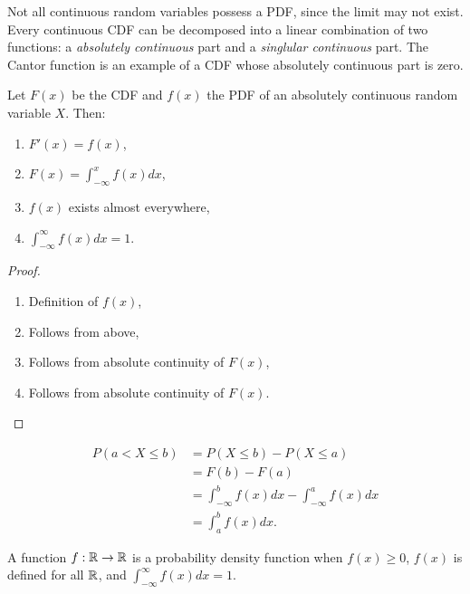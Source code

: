 \begin{rmk}
    Not all continuous random variables possess a PDF, since the limit may not exist. Every continuous CDF can be decomposed into a linear combination of two functions: a \emph{absolutely continuous} part and a \emph{singlular continuous} part. The Cantor function is an example of a CDF whose absolutely continuous part is zero.
\end{rmk}

\begin{thm}
    Let $F(x)$ be the CDF and $f(x)$ the PDF of an absolutely continuous random variable $X$. Then:
    \begin{enumerate}
        \item $F'(x) = f(x)$,
        \item $F(x) = \int_{-\infty}^{x}f(x)dx$,
        \item $f(x)$ exists almost everywhere,
        \item $\int_{-\infty}^{\infty}f(x)dx = 1$.
    \end{enumerate}
\end{thm}

\begin{proof}\proofbreak
    \begin{enumerate}
        \item Definition of $f(x)$,
        \item Follows from above,
        \item Follows from absolute continuity of $F(x)$,
        \item Follows from absolute continuity of $F(x)$.
    \end{enumerate}
\end{proof}

\begin{cor}
    \begin{align*}
        P(a < X \leq b) &= P(X \leq b) - P(X \leq a) \\
        &= F(b) - F(a) \\
        &= \int_{-\infty}^{b}f(x)dx - \int_{-\infty}^{a}f(x)dx \\
        &= \int_{a}^{b}f(x)dx.
    \end{align*}
\end{cor}

\begin{prop}
    A function $f: \mathbb{R} \to \mathbb{R}$ is a probability density function when $f(x) \geq 0$, $f(x)$ is defined for all $\mathbb{R}$, and $\int_{-\infty}^{\infty}f(x)dx = 1$.
\end{prop}

